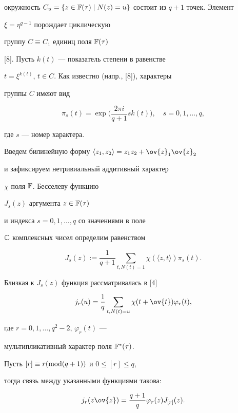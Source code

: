 окружность $C_u=\{z\in{\Bbb F(\tau)}\mid


N(z)=u\}$ состоит из $q+1$ точек. Элемент


$\xi=\eta^{q-1}$ порождает циклическую


группу $C\equiv{C_1}$ единиц поля $\Bbb F(\tau)$


[8]. Пусть $k(t)$ --- показатель степени в равенстве


$t=\xi^{k(t)}$, $t\in{C}$. Как известно (напр., [8]), характеры


группы $C$ имеют вид


$$


\pi_s(t)=\exp \bigg(\frac{2\pi i}{q+1}sk(t) \bigg),\quad s=0,1,\dotsc,q,


$$


где $s$ --- номер характера.


Введем билинейную форму $\langle z_1,z_2\rangle=z_1z_2+\ov{z}_1\ov{z}_2$


и зафиксируем нетривиальный аддитивный характер


$\chi$ поля $\Bbb F$. Бесселеву функцию


$J_s(z)$ аргумента $z\in{\Bbb F(\tau)}$


и индекса $s=0,1,\dotsc,q$ со значениями в поле


$\Bbb C$ комплексных чисел определим равенством


$$


J_s(z):=\frac{1}{q+1} \sum_{t,N(t)=1}{\chi(\langle z,t\rangle)\pi_s(t)}.


$$





Близкая к $J_s(z)$ функция рассматривалась в [4]


\begin{equation}


j_r(u)=\frac{1}{q}\sum_{t, N(t)=u}{\chi(t+\ov{t})\varphi_r(t)},


\end{equation}


где $r=0,1,\dotsc,q^2-2$, $\varphi_r(t)$ ---


мультипликативный характер поля $\Bbb F^*(\tau)$.


Пусть ${[r]}\equiv{r(\operatorname{mod}(q+1))}$ и ${0}\le{[r]}\le{q}$,


тогда связь между указанными функциями такова:


\begin{equation}


j_r(z\ov{z})=\frac{q+1}{q}\varphi_r(z)J_{[r]}(z).


\end{equation}





